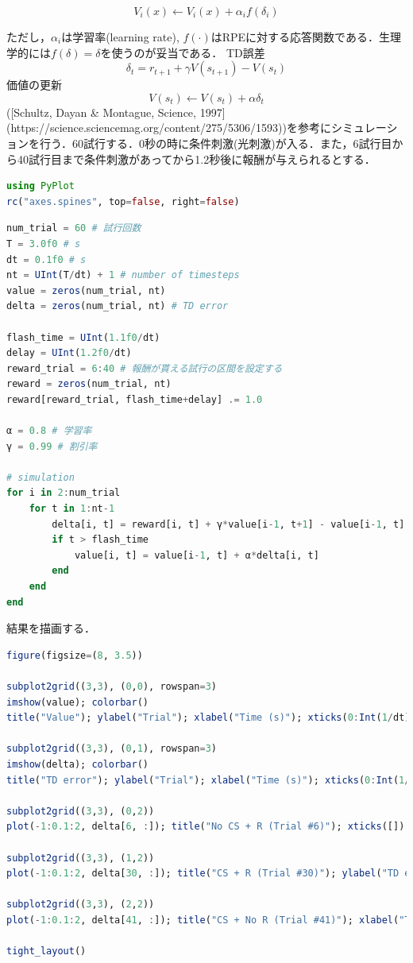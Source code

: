 \begin{equation}
V_{i}(x) \leftarrow V_{i}(x)+\alpha_{i} f\left(\delta_{i}\right) 
\end{equation}
 
ただし，$\alpha_{i}$は学習率(learning rate), $f(\cdot)$はRPEに対する応答関数である．生理学的には$f(\delta)=\delta$を使うのが妥当である．
TD誤差
\begin{equation}
\delta_{t} = r_{t+1} + \gamma V(s_{t+1}) - V(s_{t})
\end{equation}
価値の更新
\begin{equation}
V(s_{t}) \leftarrow V(s_{t}) + \alpha \delta_{t}
\end{equation}
([Schultz, Dayan & Montague, Science, 1997](https://science.sciencemag.org/content/275/5306/1593))を参考にシミュレーションを行う．60試行する．0秒の時に条件刺激(光刺激)が入る．また，6試行目から40試行目まで条件刺激があってから1.2秒後に報酬が与えられるとする．
\begin{lstlisting}[language=julia]
using PyPlot
rc("axes.spines", top=false, right=false)
\end{lstlisting}
\begin{lstlisting}[language=julia]
num_trial = 60 # 試行回数
T = 3.0f0 # s
dt = 0.1f0 # s
nt = UInt(T/dt) + 1 # number of timesteps
value = zeros(num_trial, nt) 
delta = zeros(num_trial, nt) # TD error

flash_time = UInt(1.1f0/dt)
delay = UInt(1.2f0/dt)
reward_trial = 6:40 # 報酬が貰える試行の区間を設定する
reward = zeros(num_trial, nt)
reward[reward_trial, flash_time+delay] .= 1.0

α = 0.8 # 学習率
γ = 0.99 # 割引率

# simulation
for i in 2:num_trial
    for t in 1:nt-1
        delta[i, t] = reward[i, t] + γ*value[i-1, t+1] - value[i-1, t]
        if t > flash_time
            value[i, t] = value[i-1, t] + α*delta[i, t]
        end
    end
end
\end{lstlisting}
結果を描画する．
\begin{lstlisting}[language=julia]
figure(figsize=(8, 3.5))

subplot2grid((3,3), (0,0), rowspan=3)
imshow(value); colorbar()
title("Value"); ylabel("Trial"); xlabel("Time (s)"); xticks(0:Int(1/dt):nt, -1:1:T-1)

subplot2grid((3,3), (0,1), rowspan=3)
imshow(delta); colorbar()
title("TD error"); ylabel("Trial"); xlabel("Time (s)"); xticks(0:Int(1/dt):nt, -1:1:T-1)

subplot2grid((3,3), (0,2))
plot(-1:0.1:2, delta[6, :]); title("No CS + R (Trial #6)"); xticks([])

subplot2grid((3,3), (1,2))
plot(-1:0.1:2, delta[30, :]); title("CS + R (Trial #30)"); ylabel("TD error"); xticks([])

subplot2grid((3,3), (2,2))
plot(-1:0.1:2, delta[41, :]); title("CS + No R (Trial #41)"); xlabel("Time (s)")

tight_layout()
\end{lstlisting}
